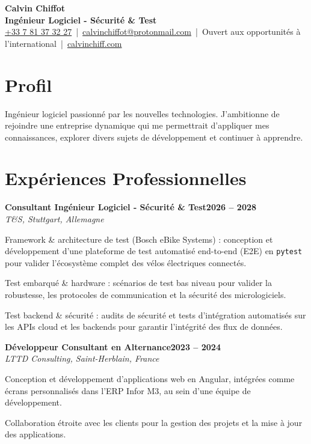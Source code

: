 \documentclass[10pt,a4paper]{article}
\newcommand{\cventry}[3]{%
	\vspace{3pt}%
	\noindent\textbf{#1}\hfill\textbf{#2}\\[1pt]
	\noindent\hspace{1.2em}\textit{#3}\par\vspace{1pt}%
}
\begin{document}
\pagestyle{empty}

\begin{center}
	{\huge \textbf{Calvin Chiffot}}\\[4pt]
	{\large \textbf{Ingénieur Logiciel - Sécurité \& Test}}\\[6pt]
	\small
	\href{tel:+33781373227}{+33 7 81 37 32 27} \,|\, 
	\href{mailto:calvinchiffot@protonmail.com}{calvinchiffot@protonmail.com} \,|\, 
	Ouvert aux opportunités à l'international \,|\, 
	\href{https://calvinchiff.com}{calvinchiff.com}
\end{center}

\section{Profil}
Ingénieur logiciel passionné par les nouvelles technologies. J'ambitionne de rejoindre une entreprise dynamique qui me permettrait d'appliquer mes connaissances, explorer divers sujets de développement et continuer à apprendre.

\section{Expériences Professionnelles}

\cventry{Consultant Ingénieur Logiciel - Sécurité \& Test}{2026 -- 2028}{T\&S, Stuttgart, Allemagne}
\begin{cvlist}
	\item Framework \& architecture de test (Bosch eBike Systems) : conception et développement d'une plateforme de test automatisé end-to-end (E2E) en \texttt{pytest} pour valider l'écosystème complet des vélos électriques connectés.
	\item Test embarqué \& hardware : scénarios de test bas niveau pour valider la robustesse, les protocoles de communication et la sécurité des micrologiciels.
	\item Test backend \& sécurité : audits de sécurité et tests d'intégration automatisés sur les APIs cloud et les backends pour garantir l'intégrité des flux de données.
\end{cvlist}

\cventry{Développeur Consultant en Alternance}{2023 -- 2024}{LTTD Consulting, Saint-Herblain, France}
\begin{cvlist}
	\item Conception et développement d'applications web en Angular, intégrées comme écrans personnalisés dans l'ERP Infor M3, au sein d'une équipe de développement.
	\item Collaboration étroite avec les clients pour la gestion des projets et la mise à jour des applications.
\end{cvlist}
\end{document}
